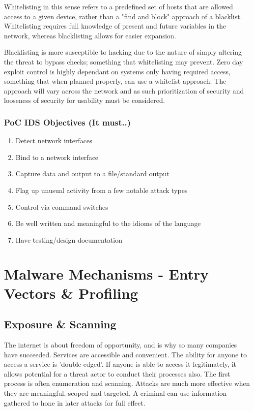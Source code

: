 Whitelisting in this sense refers to a predefined set of hosts
that are allowed access to a given device, rather than a "find and block" approach of a blacklist. Whitelisting requires full knowledge of present and future variables in the network, whereas blacklisting
allows for easier expansion. 

Blacklisting is more susceptible to hacking due to the nature of simply altering the threat to bypass checks; something that whitelisting may prevent. Zero day exploit control is 
highly dependant on systems only having required access, something that when planned properly, can use a whitelist approach. The approach will vary across the network and as such prioritization of security 
and looseness of security for usability must be considered.


\subsection{PoC IDS Objectives (It must..)}
\begin{enumerate}
	\item Detect network interfaces
	\item Bind to a network interface
	\item Capture data and output to a file/standard output
	\item Flag up unusual activity from a few notable attack types
	\item Control via command switches
	\item Be well written and meaningful to the idioms of the language
	\item Have testing/design documentation
\end{enumerate}


\chapter{Malware Mechanisms - Entry Vectors \& Profiling}
\section{Exposure \& Scanning}
The internet is about freedom of opportunity, and is why so many companies have succeeded. Services are accessible and convenient. The ability for anyone to access a service is 'double-edged'.
If anyone is able to access it legitimately, it allows potential for a threat actor to conduct their processes also. The first process is often enumeration and scanning. Attacks are much more effective when they are meaningful, scoped and targeted.
A criminal can use information gathered to hone in later attacks for full effect.  

